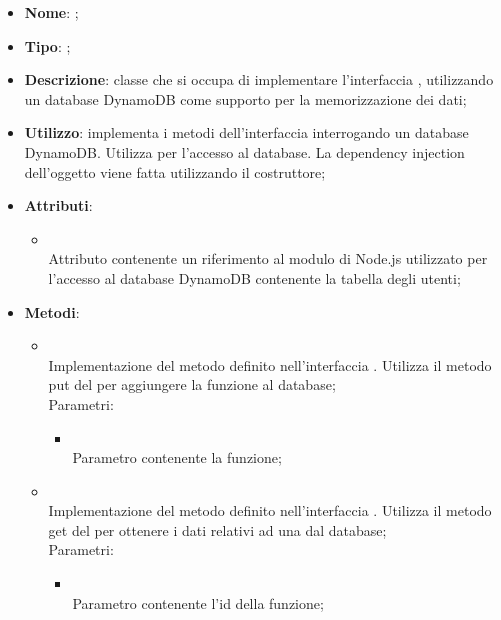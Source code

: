 \begin{itemize}
	\item \textbf{Nome}: ;
	\item \textbf{Tipo}: ;
	\item \textbf{Descrizione}: classe che si occupa di implementare l'interfaccia , utilizzando un database DynamoDB come supporto per la memorizzazione dei dati;
	\item \textbf{Utilizzo}: implementa i metodi dell'interfaccia  interrogando un database DynamoDB. Utilizza  per l'accesso al database. La dependency injection dell'oggetto  viene fatta utilizzando il costruttore;
	\item \textbf{Attributi}:
	\begin{itemize}
		\item[]  \\
		Attributo contenente un riferimento al modulo di Node.js utilizzato per l'accesso al database DynamoDB contenente la tabella degli utenti;
	\end{itemize}
	\item \textbf{Metodi}:
	\begin{itemize}
		\item[]  \\
		Implementazione del metodo definito nell'interfaccia . Utilizza il metodo put del  per aggiungere la funzione al database;\\
		Parametri:
		\begin{itemize}
			\item {} \\
			Parametro contenente la funzione;
		\end{itemize}
		\item[]  \\
		Implementazione del metodo definito nell'interfaccia . Utilizza il metodo get del  per ottenere i dati relativi ad una  dal database;\\
		Parametri:
		\begin{itemize}
			\item {} \\
			Parametro contenente l'id della funzione;
		\end{itemize}

\end{itemize}
\end{itemize}
